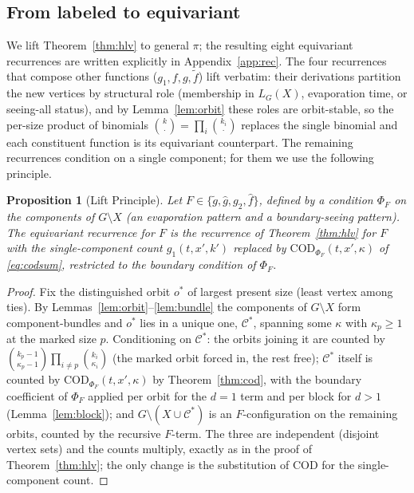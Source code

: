 \documentclass[11pt]{article}
\theoremstyle{plain}
\newtheorem{proposition}{Proposition}
\theoremstyle{definition}
\newcommand{\gtil}{\tilde g}
\newcommand{\ghat}{\hat g}
\newcommand{\ftil}{\tilde f}
\newcommand{\fhat}{\hat f}
\begin{document}
\subsection{From labeled to equivariant}\label{sec:lift}

We lift Theorem~\ref{thm:hlv} to general $\pi$; the resulting eight equivariant recurrences are
written explicitly in Appendix~\ref{app:rec}. The four recurrences that compose other functions
($g_1,f,g,\ftil$) lift verbatim: their derivations partition the new vertices by structural role
(membership in $L_G(X)$, evaporation time, or seeing-all status), and by Lemma~\ref{lem:orbit} these
roles are orbit-stable, so the per-size product of binomials
$\binom{k}{\cdot}=\prod_i\binom{k_i}{\cdot}$ replaces the single binomial and each constituent
function is its equivariant counterpart. The remaining recurrences condition on a single component;
for them we use the following principle.

\begin{proposition}[Lift Principle]\label{prop:lift}
Let $F\in\{\gtil,\ghat,g_2,\fhat\}$, defined by a condition $\Phi_F$ on the components of $G\setminus
X$ (an evaporation pattern and a boundary-seeing pattern). The equivariant recurrence for $F$ is the
recurrence of Theorem~\ref{thm:hlv} for $F$ with the single-component count $g_1(t,x',k')$ replaced by
$\mathrm{COD}_{\Phi_F}(t,x',\kappa)$ of \eqref{eq:codsum}, restricted to the boundary condition of
$\Phi_F$.
\end{proposition}

\begin{proof}
Fix the distinguished orbit $o^\ast$ of largest present size (least vertex among ties). By
Lemmas~\ref{lem:orbit}--\ref{lem:bundle} the components of $G\setminus X$ form component-bundles and
$o^\ast$ lies in a unique one, $\mathcal C^\ast$, spanning some $\kappa$ with $\kappa_{p}\ge1$ at the
marked size $p$. Conditioning on $\mathcal C^\ast$: the orbits joining it are counted by
$\binom{k_p-1}{\kappa_p-1}\prod_{i\ne p}\binom{k_i}{\kappa_i}$ (the marked orbit forced in, the rest
free); $\mathcal C^\ast$ itself is counted by $\mathrm{COD}_{\Phi_F}(t,x',\kappa)$ by
Theorem~\ref{thm:cod}, with the boundary coefficient of $\Phi_F$ applied per orbit for the $d=1$ term
and per block for $d>1$ (Lemma~\ref{lem:block}); and $G\setminus(X\cup\mathcal C^\ast)$ is an
$F$-configuration on the remaining orbits, counted by the recursive $F$-term. The three are
independent (disjoint vertex sets) and the counts multiply, exactly as in the proof of
Theorem~\ref{thm:hlv}; the only change is the substitution of $\mathrm{COD}$ for the single-component
count.
\end{proof}
\end{document}
